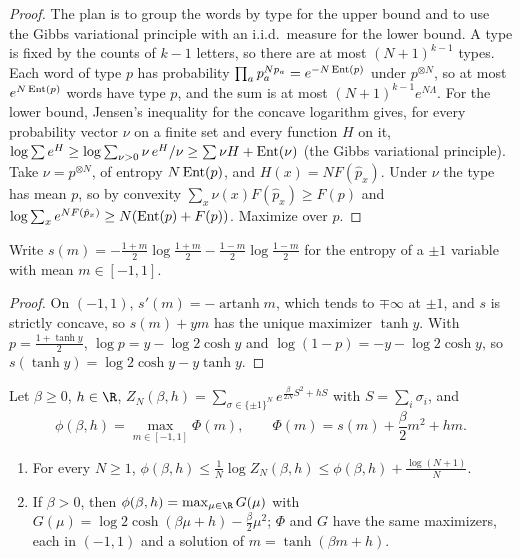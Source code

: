 \begin{refsection}
\begin{proof}
The plan is to group the words by type for the upper bound and to use the Gibbs variational principle with an i.i.d.\ measure for the lower bound. A type is fixed by the counts of $k-1$ letters, so there are at most $(N+1)^{k-1}$ types. Each word of type $p$ has probability $\prod_ap_a^{Np_a}=e^{-N\operatorname{Ent}(p)}$ under $p^{\otimes N}$, so at most $e^{N\operatorname{Ent}(p)}$ words have type $p$, and the sum is at most $(N+1)^{k-1}e^{N\Lambda}$. For the lower bound, Jensen's inequality for the concave logarithm gives, for every probability vector $\nu$ on a finite set and every function $H$ on it, $\log\sum e^H\ge\log\sum_{\nu>0}\nu\,e^H/\nu\ge\sum\nu H+\operatorname{Ent}(\nu)$ (the Gibbs variational principle). Take $\nu=p^{\otimes N}$, of entropy $N\operatorname{Ent}(p)$, and $H(x)=NF(\hat p_x)$. Under $\nu$ the type has mean $p$, so by convexity $\sum_x\nu(x)F(\hat p_x)\ge F(p)$ and $\log\sum_xe^{NF(\hat p_x)}\ge N(\operatorname{Ent}(p)+F(p))$. Maximize over $p$.
\end{proof}

Write $s(m)=-\frac{1+m}2\log\frac{1+m}2-\frac{1-m}2\log\frac{1-m}2$ for the entropy of a $\pm1$ variable with mean $m\in[-1,1]$.


\begin{proof}
On $(-1,1)$, $s'(m)=-\operatorname{artanh}m$, which tends to $\mp\infty$ at $\pm1$, and $s$ is strictly concave, so $s(m)+ym$ has the unique maximizer $\tanh y$. With $p=\frac{1+\tanh y}2$, $\log p=y-\log2\cosh y$ and $\log(1-p)=-y-\log2\cosh y$, so $s(\tanh y)=\log2\cosh y-y\tanh y$.
\end{proof}

\begin{theorem}\label{thm:freeentropy:curieweiss}
Let $\beta\ge0$, $h\in\R$, $Z_N(\beta,h)=\sum_{\sigma\in\{\pm1\}^N}e^{\frac\beta{2N}S^2+hS}$ with $S=\sum_i\sigma_i$, and
\[
\phi(\beta,h)=\max_{m\in[-1,1]}\Phi(m),\qquad\Phi(m)=s(m)+\frac\beta2m^2+hm.
\]
\begin{enumerate}
\item For every $N\ge1$, $\phi(\beta,h)\le\frac1N\log Z_N(\beta,h)\le\phi(\beta,h)+\frac{\log(N+1)}N$.
\item If $\beta>0$, then $\phi(\beta,h)=\max_{\mu\in\R}G(\mu)$ with $G(\mu)=\log2\cosh(\beta\mu+h)-\frac\beta2\mu^2$; $\Phi$ and $G$ have the same maximizers, each in $(-1,1)$ and a solution of $m=\tanh(\beta m+h)$.
\end{enumerate}
\end{theorem}


\end{refsection}
